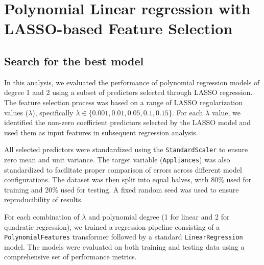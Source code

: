 \documentclass[12pt]{article}
\begin{document}
\section{Polynomial Linear regression with LASSO-based Feature Selection}

\subsection{Search for the best model}

In this analysis, we evaluated the performance of polynomial regression models of degree 1 and 2 using
 a subset of predictors selected through LASSO regression. The feature selection process was based on a
  range of LASSO regularization values ($\lambda$), specifically $\lambda \in \{0.001, 0.01, 0.05, 0.1, 0.15\}$.
   For each $\lambda$ value, we identified the non-zero coefficient predictors selected by the LASSO model 
   and used them as input features in subsequent regression analysis.

All selected predictors were standardized using the \texttt{StandardScaler} to ensure zero mean 
and unit variance. The target variable (\texttt{Appliances}) was also standardized to facilitate proper 
comparison of errors across different model configurations. The dataset was then split into equal halves, 
with 80\% used for training and 20\% used for testing. A fixed random seed was used to ensure reproducibility of results.

For each combination of $\lambda$ and polynomial degree (1 for linear and 2 for quadratic regression), 
we trained a regression pipeline consisting of a \texttt{PolynomialFeatures} transformer followed by a 
standard \texttt{LinearRegression} model. The models were evaluated on both training and testing data using
a comprehensive set of performance metrics.
\end{document}
